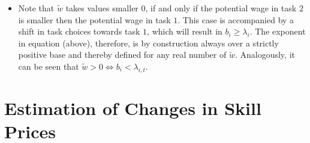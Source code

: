 \documentclass{article}
\begin{document}
\begin{itemize}
			\item{Note that $\tilde{w}$ takes values smaller $0$, if and only if the potential wage in task $2$ is smaller then the potential wage in task $1$. This case is accompanied by a shift in task choices towards task $1$, which will result in $b_i \geq \lambda_i$. The exponent in equation (above), therefore, is by construction always over a strictly positive base and thereby defined for any real number of $\tilde{w}$. Analogously, it can be seen that $\tilde{w} > 0 \iff b_i < \lambda_{i,t}$.}



		\end{itemize}

\section{Estimation of Changes in Skill Prices}
\end{document}
